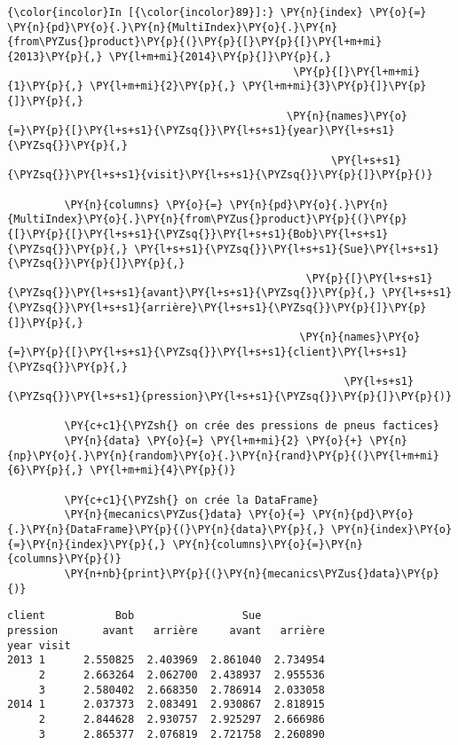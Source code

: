     \begin{Verbatim}[commandchars=\\\{\}]
{\color{incolor}In [{\color{incolor}89}]:} \PY{n}{index} \PY{o}{=} \PY{n}{pd}\PY{o}{.}\PY{n}{MultiIndex}\PY{o}{.}\PY{n}{from\PYZus{}product}\PY{p}{(}\PY{p}{[}\PY{p}{[}\PY{l+m+mi}{2013}\PY{p}{,} \PY{l+m+mi}{2014}\PY{p}{]}\PY{p}{,}
                                             \PY{p}{[}\PY{l+m+mi}{1}\PY{p}{,} \PY{l+m+mi}{2}\PY{p}{,} \PY{l+m+mi}{3}\PY{p}{]}\PY{p}{]}\PY{p}{,}
                                            \PY{n}{names}\PY{o}{=}\PY{p}{[}\PY{l+s+s1}{\PYZsq{}}\PY{l+s+s1}{year}\PY{l+s+s1}{\PYZsq{}}\PY{p}{,}
                                                   \PY{l+s+s1}{\PYZsq{}}\PY{l+s+s1}{visit}\PY{l+s+s1}{\PYZsq{}}\PY{p}{]}\PY{p}{)}
         
         \PY{n}{columns} \PY{o}{=} \PY{n}{pd}\PY{o}{.}\PY{n}{MultiIndex}\PY{o}{.}\PY{n}{from\PYZus{}product}\PY{p}{(}\PY{p}{[}\PY{p}{[}\PY{l+s+s1}{\PYZsq{}}\PY{l+s+s1}{Bob}\PY{l+s+s1}{\PYZsq{}}\PY{p}{,} \PY{l+s+s1}{\PYZsq{}}\PY{l+s+s1}{Sue}\PY{l+s+s1}{\PYZsq{}}\PY{p}{]}\PY{p}{,}
                                               \PY{p}{[}\PY{l+s+s1}{\PYZsq{}}\PY{l+s+s1}{avant}\PY{l+s+s1}{\PYZsq{}}\PY{p}{,} \PY{l+s+s1}{\PYZsq{}}\PY{l+s+s1}{arrière}\PY{l+s+s1}{\PYZsq{}}\PY{p}{]}\PY{p}{]}\PY{p}{,}
                                              \PY{n}{names}\PY{o}{=}\PY{p}{[}\PY{l+s+s1}{\PYZsq{}}\PY{l+s+s1}{client}\PY{l+s+s1}{\PYZsq{}}\PY{p}{,}
                                                     \PY{l+s+s1}{\PYZsq{}}\PY{l+s+s1}{pression}\PY{l+s+s1}{\PYZsq{}}\PY{p}{]}\PY{p}{)}
         
         \PY{c+c1}{\PYZsh{} on crée des pressions de pneus factices}
         \PY{n}{data} \PY{o}{=} \PY{l+m+mi}{2} \PY{o}{+} \PY{n}{np}\PY{o}{.}\PY{n}{random}\PY{o}{.}\PY{n}{rand}\PY{p}{(}\PY{l+m+mi}{6}\PY{p}{,} \PY{l+m+mi}{4}\PY{p}{)}
         
         \PY{c+c1}{\PYZsh{} on crée la DataFrame}
         \PY{n}{mecanics\PYZus{}data} \PY{o}{=} \PY{n}{pd}\PY{o}{.}\PY{n}{DataFrame}\PY{p}{(}\PY{n}{data}\PY{p}{,} \PY{n}{index}\PY{o}{=}\PY{n}{index}\PY{p}{,} \PY{n}{columns}\PY{o}{=}\PY{n}{columns}\PY{p}{)}
         \PY{n+nb}{print}\PY{p}{(}\PY{n}{mecanics\PYZus{}data}\PY{p}{)}
\end{Verbatim}


    \begin{Verbatim}[commandchars=\\\{\}]
client           Bob                 Sue          
pression       avant   arrière     avant   arrière
year visit                                        
2013 1      2.550825  2.403969  2.861040  2.734954
     2      2.663264  2.062700  2.438937  2.955536
     3      2.580402  2.668350  2.786914  2.033058
2014 1      2.037373  2.083491  2.930867  2.818915
     2      2.844628  2.930757  2.925297  2.666986
     3      2.865377  2.076819  2.721758  2.260890

    \end{Verbatim}


